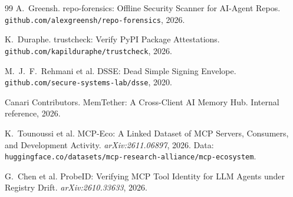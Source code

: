\documentclass[11pt,a4paper]{article}
\begin{document}
\begin{thebibliography}{99}
 A.~Greensh.
repo-forensics: Offline Security Scanner for AI-Agent Repos.
\texttt{github.com/alexgreensh/repo-forensics}, 2026.

 K.~Duraphe.
trustcheck: Verify PyPI Package Attestations.
\texttt{github.com/kapilduraphe/trustcheck}, 2026.

 M.~J.~F.~Rehmani et al.
DSSE: Dead Simple Signing Envelope.
\texttt{github.com/secure-systems-lab/dsse}, 2020.

 Canari Contributors.
MemTether: A Cross-Client AI Memory Hub.
Internal reference, 2026.

 K.~Tounoussi et al.
MCP-Eco: A Linked Dataset of MCP Servers, Consumers, and Development Activity.
\emph{arXiv:2611.06897}, 2026. Data: \texttt{huggingface.co/datasets/mcp-research-alliance/mcp-ecosystem}.

 G.~Chen et al.
ProbeID: Verifying MCP Tool Identity for LLM Agents under Registry Drift.
\emph{arXiv:2610.33633}, 2026.

\end{thebibliography}
\end{document}
